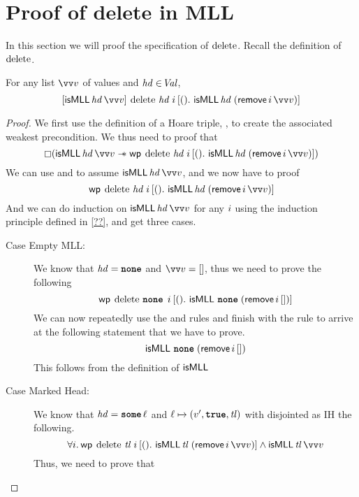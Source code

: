 \documentclass[thesis.tex]{subfiles}
\begin{document}
\section{Proof of delete in MLL}
\label{sec:proofmll}
In this section we will proof the specification of $\operatorname{delete}$. Recall the definition of $\operatorname{delete}$.
\MLLDeleteProg
\\
\begin{lemma}
  For any list $\vect{\val}$ of values and $\mathit{hd}\in\kern-0.2em\textit{Val}$,
  \[
    \hoare{\textlog{isMLL}\, \langv{hd}\, \vect{\val}}{\MLLdelete\, \langv{hd}\; \iindex }{().\ \textlog{isMLL}\, \langv{hd}\; (\textlog{remove}\, \iindex\, \vect{v})}
  \]
\end{lemma}
\begin{proof}
  We first use the definition of a Hoare triple, , to create the associated weakest precondition.
  We thus need to proof that
  \[\always(\textlog{isMLL}\, \langv{hd}\, \vect{\val} \wand \wpre{\MLLdelete\, \langv{hd}\; \iindex}{().\ \textlog{isMLL}\, \langv{hd}\; (\textlog{remove}\, \iindex\, \vect{v})})\]
  We can use  and  to assume
  $\textlog{isMLL}\, \langv{hd}\, \vect{\val}$, and we now have to proof
  \[\wpre{\MLLdelete\, \langv{hd}\; \iindex}{().\ \textlog{isMLL}\, \langv{hd}\; (\textlog{remove}\, \iindex\, \vect{v})}\]
  And we can do induction on $\textlog{isMLL}\, \langv{hd}\, \vect{\val}$ for any $i$ using the induction principle defined in \cref*{??}, and get three cases.
  \begin{description}
    \item[Case Empty MLL:] We know that $\mathit{hd} = \operatorname{\texttt{\bfseries none}}$ and $\vect{\val} = []$, thus we need to prove the following
      \[\wpre{\MLLdelete\, \None\; \iindex}{().\ \textlog{isMLL}\, \None\; (\textlog{remove}\, \iindex\, [])}\]
      We can now repeatedly use the  and  rules and finish with the rule  to arrive at the following statement that we have to prove.
      \[\textsf{\upshape isMLL}\, \operatorname{\texttt{\bfseries none}}\; (\textsf{\upshape remove}\, i\, [])\]
      This follows from the definition of $\textsf{\upshape isMLL}$
    \item[Case Marked Head:] We know that $\mathit{hd} = \operatorname{\texttt{\bfseries some}} \ell$ and $\loc \fmapsto (\val', \True, \langv{tl})$ with disjointed as IH the following.
      \[\All \iindex. \wpre{\MLLdelete\, \langv{tl}\; \iindex}{().\ \textlog{isMLL}\, \langv{tl}\; (\textlog{remove}\, \iindex\, \vect{\val})} \land \textlog{isMLL}\, \langv{tl}\, \vect{\val}\]
      Thus, we need to prove that

\end{description}
\end{proof}
\end{document}
